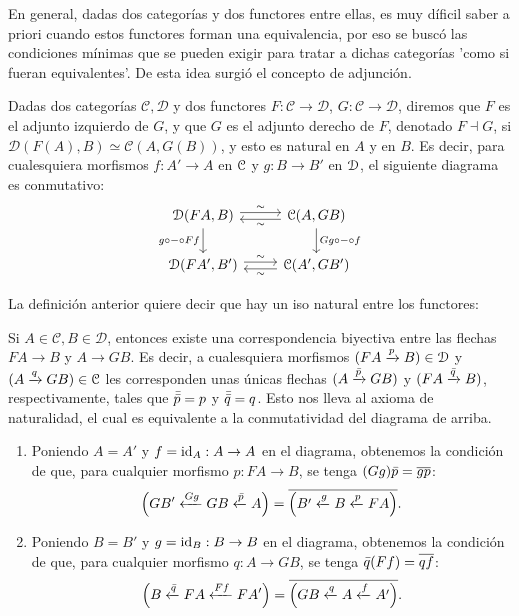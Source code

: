 En general, dadas dos categorías y dos functores entre ellas, es muy díficil saber a priori cuando estos functores forman una equivalencia, por eso se buscó las condiciones mínimas que se pueden exigir para tratar a dichas categorías 'como si fueran equivalentes'. De esta idea surgió el concepto de adjunción.
\begin{definition}
    Dadas dos categorías $\mathcal{C,D}$ y dos functores $F:\mathcal{C\to D}$, $G:\mathcal{C\to D}$, diremos que $F$ es el adjunto izquierdo de $G$, y que $G$ es el adjunto derecho de $F$, denotado $F\dashv G$, si $\mathcal{D}(F(A),B)\simeq \mathcal{C}(A,G(B))$, y esto es natural en $A$ y en $B$.
    Es decir, para cualesquiera morfismos $f:A'\to A$
    en $\cal C$ y $g:B\to B'$ en $\cal D$,
    el siguiente diagrama es conmutativo:
    \[
        \begin{tikzcd}
            \cal D(FA,B)
                \ar[d,"g\circ-\circ Ff"']
                \ar[r,"\sim",shift left]
            & \cal C(A,GB) 
                \ar[d,"Gg\circ-\circ f"]
                \ar[l,"\sim",shift left] \\
            \cal D(FA',B')
                \ar[r,"\sim",shift left]
            & \cal C(A',GB')
                \ar[l,"\sim",shift left]
        \end{tikzcd}
    \]
\end{definition}
La definición anterior quiere decir que hay un iso natural entre los functores:

Si $A\in\mathcal{C}, B\in\mathcal{D}$,
entonces existe una correspondencia biyectiva entre las flechas
$FA\to B$ y $A\to GB$.
Es decir, a cualesquiera morfismos
$(FA\xto p B)\in\cal{D}$
y $(A\xto q GB)\in\mathcal{C}$
les corresponden unas únicas flechas
$(A\xto{\Bar{p}}GB)$
y $(FA\xto{\Bar{q}}B)$,
respectivamente,
tales que $\Bar{\Bar{p}}=p$ y $\Bar{\Bar{q}}=q$.
Esto nos lleva al axioma de naturalidad,
el cual es equivalente a la conmutatividad
del diagrama de arriba.

\begin{axiom}[De naturalidad]
    \leavevmode
    \begin{enumerate}
        \item
        Poniendo $A=A'$ y $f=\id_A:A\to A$ en el diagrama,
        obtenemos la condición de que,
        para cualquier morfismo $p:FA\to B$,
        se tenga $(Gg)\bar p=\ol{gp}$:
        \[
            \Big(GB' \lar{Gg} GB \lar{\bar p} A\Big)
            =
            \ol{\Big(B' \lar g B \lar p FA \Big)}
        .\]
        \item
        Poniendo $B=B'$ y $g=\id_B:B\to B$ en el diagrama,
        obtenemos la condición de que,
        para cualquier morfismo $q:A\to GB$,
        se tenga $\bar q(Ff)=\ol{qf}$:
        \[
            \Big(B\lar{\bar q} FA\lar{Ff}FA'\Big)
            =
            \ol{\Big(GB\lar q A\lar f A'\Big)}
        .\]
    \end{enumerate}
\end{axiom}

